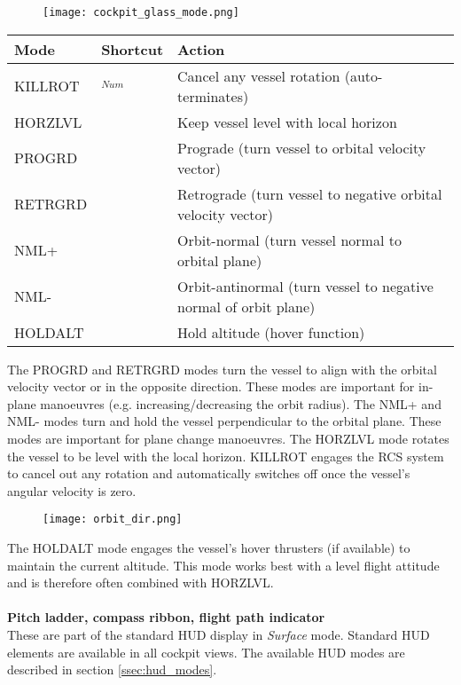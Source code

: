 \documentclass[Orbiter User Manual.tex]{subfiles}
\begin{document}
\begin{figure}[H]
  \centering
  \texttt{[image: cockpit\_glass\_mode.png]}
\end{figure}

	\begin{longtable}{ |p{}|p{}|p{}| }
	\hline\rule{0pt}{2ex}
	\textbf{Mode} & \textbf{Shortcut} & \textbf{Action}\\
	\hline\rule{0pt}{2ex}
	KILLROT & \keystroke{5}$_{Num}$ & Cancel any vessel rotation (auto-terminates)\\
	\hline\rule{0pt}{2ex}
	HORZLVL & \keystroke{L} & Keep vessel level with local horizon\\
	\hline\rule{0pt}{2ex}
	PROGRD & \keystroke{[} & Prograde (turn vessel to orbital velocity vector)\\
	\hline\rule{0pt}{2ex}
	RETRGRD & \keystroke{]} & Retrograde (turn vessel to negative orbital velocity vector)\\
	\hline\rule{0pt}{2ex}
	NML+ & \keystroke{;} & Orbit-normal (turn vessel normal to orbital plane)\\
	\hline\rule{0pt}{2ex}
	NML- & \keystroke{'} & Orbit-antinormal (turn vessel to negative normal of orbit plane)\\
	\hline\rule{0pt}{2ex}
	HOLDALT & \keystroke{A} & Hold altitude (hover function)\\
	\hline
	\end{longtable}

\noindent
The PROGRD and RETRGRD modes turn the vessel to align with the orbital velocity vector or in the opposite direction. These modes are important for in-plane manoeuvres (e.g. increasing/decreasing the orbit radius). The NML+ and NML- modes turn and hold the vessel perpendicular to the orbital plane. These modes are important for plane change manoeuvres. The HORZLVL mode rotates the vessel to be level with the local horizon. KILLROT engages the RCS system to cancel out any rotation and automatically switches off once the vessel's angular velocity is zero.

\begin{figure}[H]
  \centering
  \texttt{[image: orbit\_dir.png]}
\end{figure}

\noindent
The HOLDALT mode engages the vessel's hover thrusters (if available) to maintain the current altitude. This mode works best with a level flight attitude and is therefore often combined with HORZLVL.\\
\\
\textbf{Pitch ladder, compass ribbon, flight path indicator}\\
These are part of the standard HUD display in \textit{Surface} mode. Standard HUD elements are available in all cockpit views. The available HUD modes are described in section \ref{ssec:hud_modes}.
\end{document}
